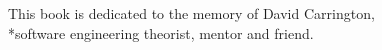 % 
% 

\thispagestyle{empty}
\begin{dedication}
This book is dedicated to the memory of David Carrington,\\*software engineering theorist, mentor and friend.
\end{dedication}
\newpage